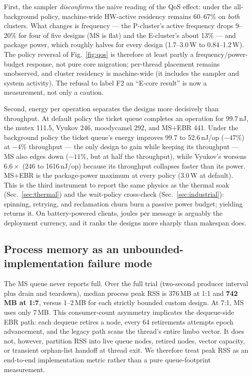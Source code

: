 \documentclass[conference]{IEEEtran}
\begin{document}
First, the sampler \emph{disconfirms} the naive reading of the QoS effect:
under the all-background policy, machine-wide HW-active residency remains
60--67\% on \emph{both} clusters. What changes is frequency --- the
P-cluster's active frequency drops 9--20\% for four of five designs (MS is
flat) and the E-cluster's about 13\% --- and package power, which roughly
halves for every design (1.7--3.0\,W to 0.84--1.2\,W). The
policy reversal of Fig.~\ref{fig:qos} is therefore at least partly a
frequency/power-budget response, not pure core migration; per-thread
placement remains unobserved, and cluster residency is machine-wide
(it includes the sampler and system activity). The refusal to label F2 an
``E-core result'' is now a measurement, not only a caution.

Second, energy per operation separates the designs more decisively than
throughput. At default policy the ticket queue completes an operation for
99.7\,nJ, the mutex 111.5, Vyukov 246, moodycamel 292, and MS+EBR 441.
Under the background policy the ticket queue's energy improves 99.7 to
52.6\,nJ/op ($-47\%$) at $-4\%$ throughput --- the only design to gain
while keeping its throughput --- MS also edges down ($-11\%$, but at half
the throughput), while Vyukov's worsens $6.6\times$ (246 to 1616\,nJ/op)
because its throughput collapses faster than its power. MS+EBR is the package-power
maximum at every policy (3.0\,W at default). This is the third instrument to
report the same physics as the thermal soak (Sec.~\ref{sec:thermal}) and the
wait-policy cross-check (Sec.~\ref{sec:industrial}): spinning, retrying, and
reclamation churn burn a passive power budget; yielding returns it. On
battery-powered clients, joules per message is arguably the deployment
currency, and it ranks the designs more sharply than makespan does.

\subsection{Process memory as an unbounded-implementation failure mode}
\label{sec:mem}
The MS queue never reports full. Over the full trial (two-second producer
interval plus drain and teardown), median process peak RSS is 376\,MB at 1:1
and \textbf{742\,MB at 1:7}, versus 1--2\,MB for each strictly bounded custom
design. At 7:1, MS uses only 7\,MB. This consumer-count asymmetry implicates the
dequeue-side EBR path: each dequeue retires a node, every 64 retirements attempts
epoch advancement, and the legacy path scans the thread's entire limbo vector.
It does not, however, partition RSS into live queue nodes, retired nodes, vector
capacity, or transient orphan-list handoff at thread exit. We therefore treat
peak RSS as an end-to-end implementation metric rather than a pure queue-footprint
measurement.
\end{document}
